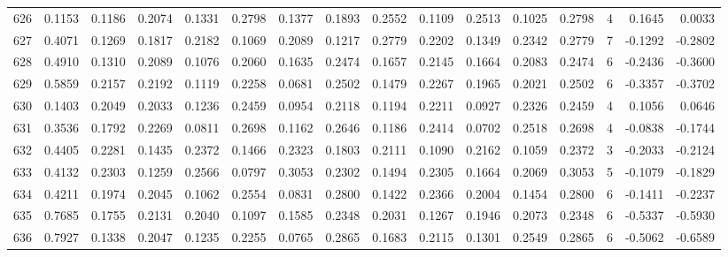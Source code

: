 \begin{tabular}{lrrrrrrrrrrrrrrr}
626 &      0.1153 &  0.1186 &  0.2074 &  0.1331 &  0.2798 &  0.1377 &  0.1893 &  0.2552 &  0.1109 &  0.2513 &   0.1025 &     0.2798 &      4 &                    0.1645 &                     0.0033 \\
627 &      0.4071 &  0.1269 &  0.1817 &  0.2182 &  0.1069 &  0.2089 &  0.1217 &  0.2779 &  0.2202 &  0.1349 &   0.2342 &     0.2779 &      7 &                   -0.1292 &                    -0.2802 \\
628 &      0.4910 &  0.1310 &  0.2089 &  0.1076 &  0.2060 &  0.1635 &  0.2474 &  0.1657 &  0.2145 &  0.1664 &   0.2083 &     0.2474 &      6 &                   -0.2436 &                    -0.3600 \\
629 &      0.5859 &  0.2157 &  0.2192 &  0.1119 &  0.2258 &  0.0681 &  0.2502 &  0.1479 &  0.2267 &  0.1965 &   0.2021 &     0.2502 &      6 &                   -0.3357 &                    -0.3702 \\
630 &      0.1403 &  0.2049 &  0.2033 &  0.1236 &  0.2459 &  0.0954 &  0.2118 &  0.1194 &  0.2211 &  0.0927 &   0.2326 &     0.2459 &      4 &                    0.1056 &                     0.0646 \\
631 &      0.3536 &  0.1792 &  0.2269 &  0.0811 &  0.2698 &  0.1162 &  0.2646 &  0.1186 &  0.2414 &  0.0702 &   0.2518 &     0.2698 &      4 &                   -0.0838 &                    -0.1744 \\
632 &      0.4405 &  0.2281 &  0.1435 &  0.2372 &  0.1466 &  0.2323 &  0.1803 &  0.2111 &  0.1090 &  0.2162 &   0.1059 &     0.2372 &      3 &                   -0.2033 &                    -0.2124 \\
633 &      0.4132 &  0.2303 &  0.1259 &  0.2566 &  0.0797 &  0.3053 &  0.2302 &  0.1494 &  0.2305 &  0.1664 &   0.2069 &     0.3053 &      5 &                   -0.1079 &                    -0.1829 \\
634 &      0.4211 &  0.1974 &  0.2045 &  0.1062 &  0.2554 &  0.0831 &  0.2800 &  0.1422 &  0.2366 &  0.2004 &   0.1454 &     0.2800 &      6 &                   -0.1411 &                    -0.2237 \\
635 &      0.7685 &  0.1755 &  0.2131 &  0.2040 &  0.1097 &  0.1585 &  0.2348 &  0.2031 &  0.1267 &  0.1946 &   0.2073 &     0.2348 &      6 &                   -0.5337 &                    -0.5930 \\
636 &      0.7927 &  0.1338 &  0.2047 &  0.1235 &  0.2255 &  0.0765 &  0.2865 &  0.1683 &  0.2115 &  0.1301 &   0.2549 &     0.2865 &      6 &                   -0.5062 &                    -0.6589 \\

\end{tabular}
